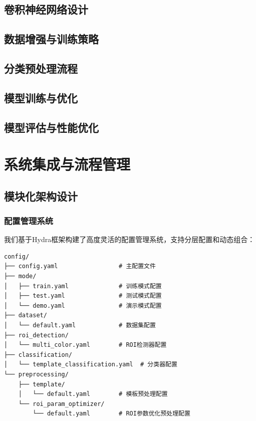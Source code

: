 \documentclass[12pt,a4paper]{article}
\begin{document}
\subsection{卷积神经网络设计}

\subsection{数据增强与训练策略}

\subsection{分类预处理流程}

\subsection{模型训练与优化}

\subsection{模型评估与性能优化}

\section{系统集成与流程管理}

\subsection{模块化架构设计}

\subsubsection{配置管理系统}

我们基于Hydra框架构建了高度灵活的配置管理系统，支持分层配置和动态组合：

\begin{verbatim}
config/
├── config.yaml                 # 主配置文件
├── mode/
│   ├── train.yaml              # 训练模式配置
│   ├── test.yaml               # 测试模式配置
│   └── demo.yaml               # 演示模式配置
├── dataset/
│   └── default.yaml            # 数据集配置
├── roi_detection/
│   └── multi_color.yaml        # ROI检测器配置
├── classification/
│   └── template_classification.yaml  # 分类器配置
└── preprocessing/
    ├── template/
    │   └── default.yaml        # 模板预处理配置
    └── roi_param_optimizer/
        └── default.yaml        # ROI参数优化预处理配置
\end{verbatim}
\end{document}
